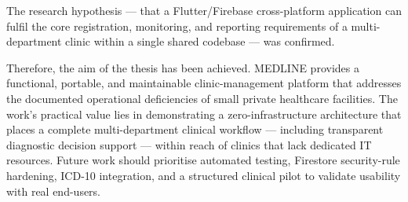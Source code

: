 \documentclass[12pt,a4paper,oneside]{report}
\begin{document}
The research hypothesis --- that a Flutter/Firebase cross-platform application
can fulfil the core registration, monitoring, and reporting requirements of a
multi-department clinic within a single shared codebase --- was confirmed.

Therefore, the aim of the thesis has been achieved. MEDLINE provides a
functional, portable, and maintainable clinic-management platform that addresses
the documented operational deficiencies of small private healthcare facilities.
The work's practical value lies in demonstrating a zero-infrastructure
architecture that places a complete multi-department clinical workflow ---
including transparent diagnostic decision support --- within reach of clinics
that lack dedicated IT resources. Future work should prioritise automated
testing, Firestore security-rule hardening, ICD-10 integration, and a structured
clinical pilot to validate usability with real end-users.
\end{document}
